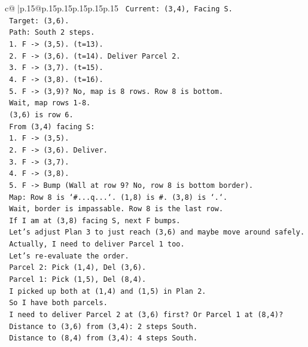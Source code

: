 \documentclass{article}
\begin{document}
{\begin{supertabular}{c@{$\;$}|p{.15\linewidth}@{}p{.15\linewidth}p{.15\linewidth}p{.15\linewidth}p{.15\linewidth}p{.15\linewidth}}
{{{\texttt{   Current: (3,4), Facing S.} \\
\texttt{   Target: (3,6).} \\
\texttt{   Path: South 2 steps.} \\
\texttt{   1. F {-}> (3,5). (t=13).} \\
\texttt{   2. F {-}> (3,6). (t=14). Deliver Parcel 2.} \\
\texttt{   3. F {-}> (3,7). (t=15).} \\
\texttt{   4. F {-}> (3,8). (t=16).} \\
\texttt{   5. F {-}> (3,9)? No, map is 8 rows. Row 8 is bottom.} \\
\texttt{   Wait, map rows 1{-}8.} \\
\texttt{   (3,6) is row 6.} \\
\texttt{   From (3,4) facing S:} \\
\texttt{   1. F {-}> (3,5).} \\
\texttt{   2. F {-}> (3,6). Deliver.} \\
\texttt{   3. F {-}> (3,7).} \\
\texttt{   4. F {-}> (3,8).} \\
\texttt{   5. F {-}> Bump (Wall at row 9? No, row 8 is bottom border).} \\
\texttt{   Map: Row 8 is `\#...q...`. (1,8) is \#. (3,8) is `.`.} \\
\texttt{   Wait, border is impassable. Row 8 is the last row.} \\
\texttt{   If I am at (3,8) facing S, next F bumps.} \\
\texttt{   Let's adjust Plan 3 to just reach (3,6) and maybe move around safely.} \\
\texttt{   Actually, I need to deliver Parcel 1 too.} \\
\texttt{   Let's re{-}evaluate the order.} \\
\texttt{   Parcel 2: Pick (1,4), Del (3,6).} \\
\texttt{   Parcel 1: Pick (1,5), Del (8,4).} \\
\texttt{   I picked up both at (1,4) and (1,5) in Plan 2.} \\
\texttt{   So I have both parcels.} \\
\texttt{   I need to deliver Parcel 2 at (3,6) first? Or Parcel 1 at (8,4)?} \\
\texttt{   Distance to (3,6) from (3,4): 2 steps South.} \\
\texttt{   Distance to (8,4) from (3,4): 4 steps South.} \\
}}}
\end{supertabular}}
\end{document}
